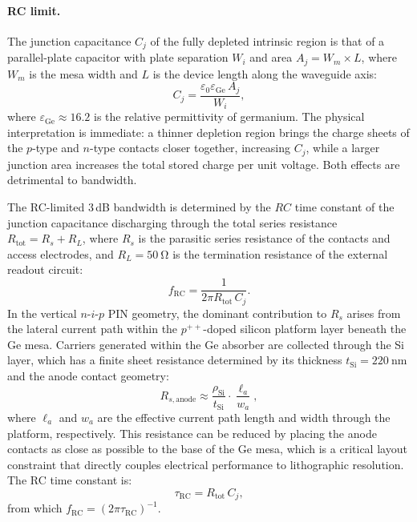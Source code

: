 \paragraph{RC limit.}
The junction capacitance $C_j$ of the fully depleted intrinsic region is that
of a parallel-plate capacitor with plate separation $W_i$ and area $A_j =
W_m \times L$, where $W_m$ is the mesa width and $L$ is the device length
along the waveguide axis:
\begin{equation}
    C_j = \frac{\varepsilon_0\varepsilon_{\mathrm{Ge}}\,A_j}{W_i},
    \label{eq:cj}
\end{equation}
where $\varepsilon_{\mathrm{Ge}} \approx 16.2$ is the relative permittivity of
germanium. The physical interpretation is immediate: a thinner depletion region
brings the charge sheets of the $p$-type and $n$-type contacts closer together,
increasing $C_j$, while a larger junction area increases the total stored charge
per unit voltage. Both effects are detrimental to bandwidth.

The RC-limited \mbox{3\,dB} bandwidth is determined by the $RC$ time constant
of the junction capacitance discharging through the total series resistance
$R_{\mathrm{tot}} = R_s + R_L$, where $R_s$ is the parasitic series resistance
of the contacts and access electrodes, and $R_L = \SI{50}{\ohm}$ is the
termination resistance of the external readout circuit:
\begin{equation}
    f_{\mathrm{RC}} = \frac{1}{2\pi R_{\mathrm{tot}}\,C_j}.
    \label{eq:metrics_bw_rc}
\end{equation}
In the vertical $n$-$i$-$p$ PIN geometry, the dominant contribution to $R_s$
arises from the lateral current path within the $p^{++}$-doped silicon platform
layer beneath the Ge mesa. Carriers generated within the Ge absorber are
collected through the Si layer, which has a finite sheet resistance determined
by its thickness $t_{\mathrm{Si}} = \SI{220}{\nano\metre}$ and the anode
contact geometry:
\begin{equation}
    R_{s,\mathrm{anode}} \approx \frac{\rho_{\mathrm{Si}}}{t_{\mathrm{Si}}}
    \cdot\frac{\ell_a}{w_a},
    \label{eq:rs_anode}
\end{equation}
where $\ell_a$ and $w_a$ are the effective current path length and width
through the platform, respectively. This resistance can be reduced by placing
the anode contacts as close as possible to the base of the Ge mesa, which is a
critical layout constraint that directly couples electrical performance to
lithographic resolution. The RC time constant is:
\begin{equation}
    \tau_{\mathrm{RC}} = R_{\mathrm{tot}}\,C_j,
    \label{eq:tau_rc}
\end{equation}
from which $f_{\mathrm{RC}} = (2\pi\tau_{\mathrm{RC}})^{-1}$.

